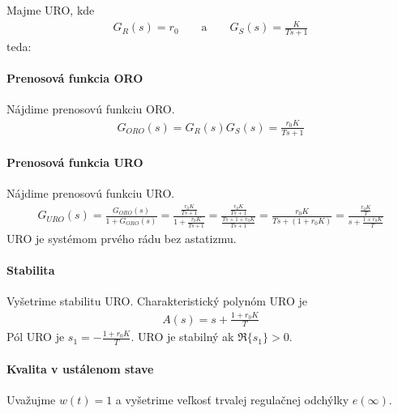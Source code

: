 \documentclass[a4paper, 10pt, ]{article}
\begin{document}
Majme URO, kde
\begin{align}
    G_R(s) = r_0 \qquad \text{a} \qquad  G_S(s) = \frac{K}{Ts+1}
\end{align}
teda:

\begin{center}

    \makebox[\textwidth][c]{%
    
    }

	\figcaption{}
	\label{URO_P_SS1R}

\end{center}



\paragraph{Prenosová funkcia ORO}
Nájdime prenosovú funkciu ORO.
\begin{align}
    G_{ORO}(s) = G_R(s) G_S(s) = \frac{r_0 K}{Ts+1}
\end{align}


\paragraph{Prenosová funkcia URO}
Nájdime prenosovú funkciu URO.
\begin{align}
    G_{URO}(s)
    =  \frac{G_{ORO}(s)}{1+G_{ORO}(s)}
    = \frac{\frac{r_0 K}{Ts+1}}{1+\frac{r_0 K}{Ts+1}}
    = \frac{\frac{r_0 K}{Ts+1}}{\frac{Ts+1 + r_0 K}{Ts+1}}
    = \frac{r_0 K}{Ts+ (1 + r_0 K)}
    = \frac{ \frac{r_0 K}{T}}{s+ \frac{1 + r_0 K}{T}}
\end{align}
URO je systémom prvého rádu bez astatizmu.




\paragraph{Stabilita}
Vyšetrime stabilitu URO. Charakteristický polynóm URO je
\begin{align}
    A(s) = s + \frac{1 + r_0 K}{T}
\end{align}
Pól URO je $s_1 = - \frac{1 + r_0 K}{T}$. URO je stabilný ak $\Re\{ s_1 \} > 0$.


\paragraph{Kvalita v ustálenom stave}
Uvažujme $w(t) = 1$ a vyšetrime veľkosť trvalej regulačnej odchýlky $e(\infty)$.
\end{document}
